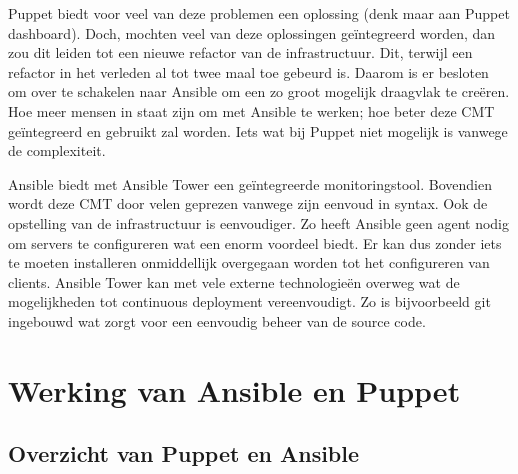 Puppet biedt voor veel van deze problemen een oplossing (denk maar aan Puppet dashboard). Doch, mochten veel van deze oplossingen ge\"integreerd worden, dan zou dit leiden tot een  nieuwe refactor van de infrastructuur. Dit, terwijl een refactor in het verleden al tot twee maal toe gebeurd is. Daarom is er besloten om over te schakelen naar Ansible om een zo groot mogelijk draagvlak te cre\"eren. Hoe meer mensen in staat zijn om met Ansible te werken; hoe beter deze \gls{CMT} ge\"integreerd en gebruikt zal worden. Iets wat bij Puppet niet mogelijk is vanwege de complexiteit.

Ansible biedt met Ansible Tower een ge\"integreerde monitoringstool. Bovendien wordt deze \gls{CMT} door velen geprezen vanwege zijn eenvoud in syntax. Ook de opstelling van de infrastructuur is eenvoudiger. Zo heeft Ansible geen agent nodig om servers te configureren wat een enorm voordeel biedt. Er kan dus zonder iets te moeten installeren onmiddellijk overgegaan worden tot het configureren van clients. Ansible Tower kan met vele externe technologie\"en overweg wat de mogelijkheden tot continuous deployment vereenvoudigt. Zo is bijvoorbeeld git ingebouwd wat zorgt voor een eenvoudig beheer van de source code.


\section{Werking van Ansible en Puppet}
\label{sec:methodologie-technische-verschillen}

\subsection{Overzicht van Puppet en Ansible}



